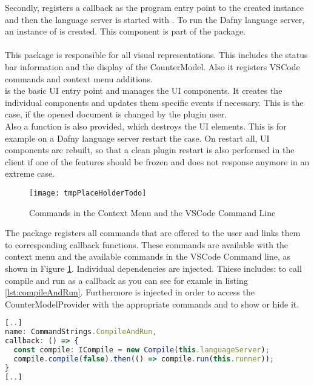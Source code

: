 Secondly,  registers a callback as the program entry point to the created  instance
and then the language server is started with .
To run the Dafny language server, an instance of  is created.
This component is part of the  package.\\

\textbf{}\\
This package is responsible for all visual representations.
This includes the status bar information and the display of the CounterModel.
Also it registers VSCode commands and context menu additions. \\

 is the basic UI entry point and manages the UI components.
It creates the individual components and updates them specific events if necessary.
This is the case, if the opened document is changed by the plugin user.\\

Also a  function is also provided, which destroys the UI elements. This is for example
on a Dafny language server restart the case. On restart all, UI components are rebuilt,
so that a clean plugin restart is also performed in the client if one of the features should
be frozen and does not response anymore in an extreme case.\\

\begin{figure}[H]
    \centering
    \texttt{[image: tmpPlaceHolderTodo]}
    \caption{Commands in the Context Menu and the VSCode Command Line}
    \label{fig:commands}
\end{figure}

The  package registers all commands that are offered to the user
and links them to corresponding callback functions.
These commands are available with the context menu
and the available commands in the VSCode Command line, as shown in Figure \ref{fig:commands}.
Individual dependencies are injected. Thiese includes:
 to call compile and run as a callback as you can see for examle in listing \ref{lst:compileAndRun}.
Furthermore  is injected
in order to access the CounterModelProvider with the appropriate commands and to show or hide it.

\begin{lstlisting}[language=typescript, caption={Excerpt from \code{commands.ts}}, captionpos=b, label={lst:compileAndRun}]
[..]
name: CommandStrings.CompileAndRun,
callback: () => {
  const compile: ICompile = new Compile(this.languageServer);
  compile.compile(false).then(() => compile.run(this.runner));
}
[..]
\end{lstlisting}


